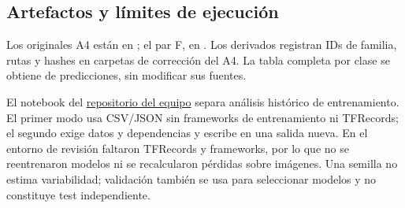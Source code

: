 \subsection{Artefactos y límites de ejecución}
Los originales A4 están en
; el par F, en
. Los derivados registran IDs de familia,
rutas y hashes en carpetas de corrección del A4. La tabla completa por clase
se obtiene de predicciones, sin modificar sus fuentes.

El notebook  del
\href{https://github.com/Lunaaaalj/NeuralNetworksTeamEnvironment}{repositorio del equipo}
separa análisis histórico de entrenamiento. El primer modo usa CSV/JSON sin
frameworks de entrenamiento ni TFRecords; el segundo exige datos y dependencias
y escribe en una salida nueva. En el entorno de revisión faltaron TFRecords y
frameworks, por lo que no se reentrenaron modelos ni se recalcularon pérdidas
sobre imágenes. Una semilla no estima variabilidad; validación también se usa
para seleccionar modelos y no constituye test independiente.
